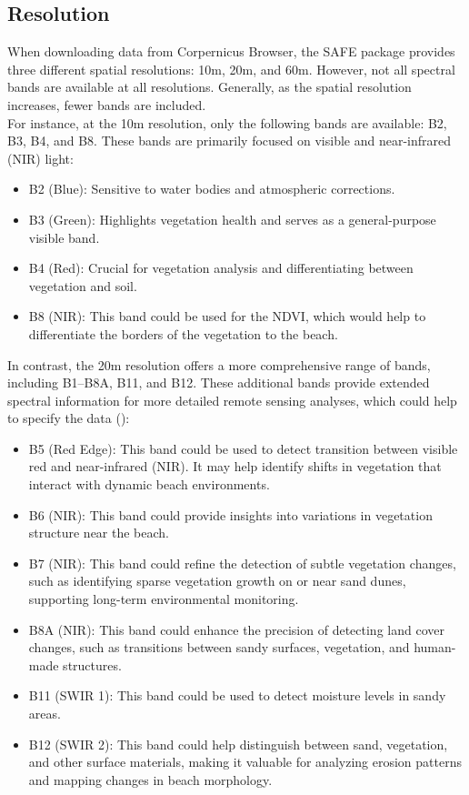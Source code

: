 \documentclass[a4paper,12pt]{article}
\begin{document}
\subsection{Resolution}
When downloading data from Corpernicus Browser, the SAFE package provides three different spatial resolutions: 10m, 20m, and 60m. However, not all spectral bands are available at all resolutions. Generally, as the spatial resolution increases,  fewer bands are included.\\
For instance, at the 10m resolution, only the following bands are available: B2, B3, B4, and B8. These bands are primarily focused on visible and near-infrared (NIR) light:
\begin{itemize}
    \item B2 (Blue): Sensitive to water bodies and atmospheric corrections.
    \item B3 (Green): Highlights vegetation health and serves as a general-purpose visible band. 
    \item B4 (Red): Crucial for vegetation analysis and differentiating between vegetation and soil.
    \item B8 (NIR): This band could be used for the NDVI, which would help to differentiate the borders of the vegetation to the beach.
\end{itemize}
In contrast, the 20m resolution offers a more comprehensive range of bands, including B1–B8A, B11, and B12. These additional bands provide extended spectral information for more detailed remote sensing analyses, which could help to specify the data (\cite{gisgeography_sentinel_2019}):
\begin{itemize}
    \item B5 (Red Edge): This band could be used to detect transition between visible red and near-infrared (NIR). It may help identify shifts in vegetation that interact with dynamic beach environments.
    \item B6 (NIR): This band could provide insights into variations in vegetation structure near the beach.
    \item B7 (NIR): This band could refine the detection of subtle vegetation changes, such as identifying sparse vegetation growth on or near sand dunes, supporting long-term environmental monitoring.
    \item B8A (NIR): This band could enhance the precision of detecting land cover changes, such as transitions between sandy surfaces, vegetation, and human-made structures.
    \item B11 (SWIR 1): This band could be used to detect moisture levels in sandy areas.
    \item B12 (SWIR 2): This band could help distinguish between sand, vegetation, and other surface materials, making it valuable for analyzing erosion patterns and mapping changes in beach morphology.
\end{itemize}
\end{document}
